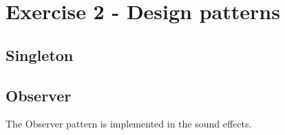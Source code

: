 \section{Exercise 2 - Design patterns }
\subsection{Singleton}
\subsection{Observer}
The Observer pattern is implemented in the sound effects.

